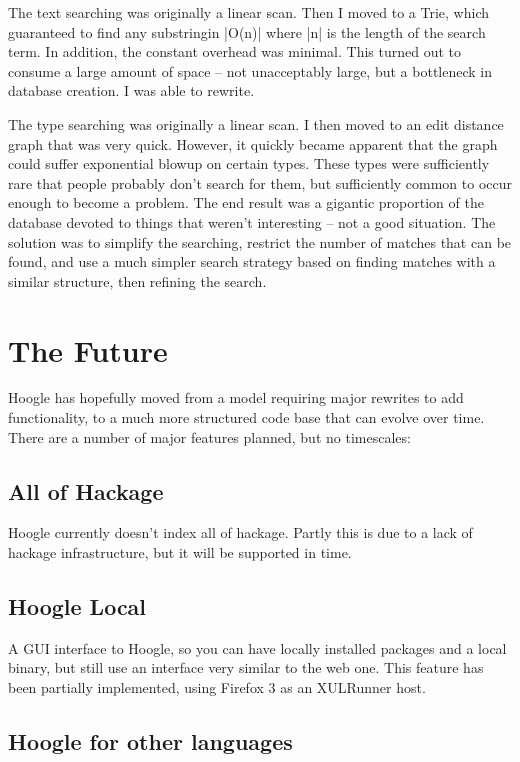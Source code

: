 \documentclass{tmr}
\begin{document}
The text searching was originally a linear scan. Then I moved to a Trie, which guaranteed to find any substringin |O(n)| where |n| is the length of the search term. In addition, the constant overhead was minimal. This turned out to consume a large amount of space -- not unacceptably large, but a bottleneck in database creation. I was able to rewrite.

The type searching was originally a linear scan. I then moved to an edit distance graph that was very quick. However, it quickly became apparent that the graph could suffer exponential blowup on certain types. These types were sufficiently rare that people probably don't search for them, but sufficiently common to occur enough to become a problem. The end result was a gigantic proportion of the database devoted to things that weren't interesting -- not a good situation. The solution was to simplify the searching, restrict the number of matches that can be found, and use a much simpler search strategy based on finding matches with a similar structure, then refining the search.

\section{The Future}

Hoogle has hopefully moved from a model requiring major rewrites to add functionality, to a much more structured code base that can evolve over time. There are a number of major features planned, but no timescales:

\subsection{All of Hackage}

Hoogle currently doesn't index all of hackage. Partly this is due to a lack of hackage infrastructure, but it will be supported in time.

\subsection{Hoogle Local}

A GUI interface to Hoogle, so you can have locally installed packages and a local binary, but still use an interface very similar to the web one. This feature has been partially implemented, using Firefox 3 as an XULRunner host.

\subsection{Hoogle for other languages}
\end{document}
